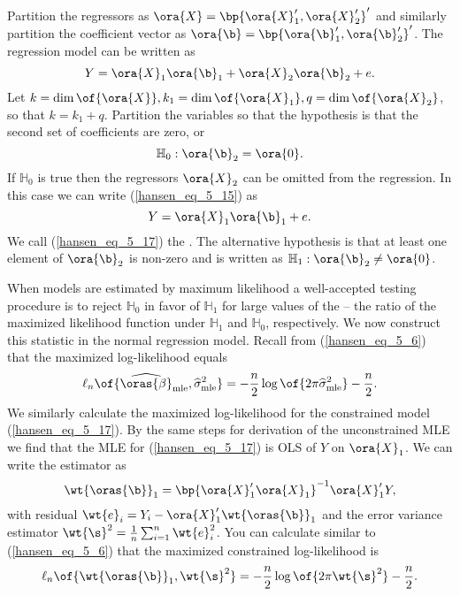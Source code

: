 Partition the regressors as $\ora{X} = \bp{\ora{X}_1^{\prime}, \ora{X}_2^{\prime}}^{\prime}$ and similarly partition the coefficient vector as $\ora{\b} = \bp{\ora{\b}_1^{\prime}, \ora{\b}_2^{\prime}}^{\prime}$. The regression model can be written as 
\begin{equation}
    \label{hansen_eq_5_15}
    Y = \ora{X}_1 \ora{\b}_1 + \ora{X}_2 \ora{\b}_2 + e.
\end{equation}
Let $k = \dim\of{\ora{X}}, k_1 = \dim\of{\ora{X}_1}, q = \dim\of{\ora{X}_2}$, so that $k = k_1 + q$. Partition the variables so that the hypothesis is that the second set of coefficients are zero, or 
\begin{equation}
    \label{hansen_eq_5_16}
    \mathbb{H}_0: \ora{\b}_2 = \ora{0}.
\end{equation}
If $\mathbb{H}_0$ is true then the regressors $\ora{X}_2$ can be omitted from the regression. In this case we can write (\ref{hansen_eq_5_15}) as 
\begin{equation}
    \label{hansen_eq_5_17}
    Y = \ora{X}_1 \ora{\b}_1 + e.
\end{equation}
We call (\ref{hansen_eq_5_17}) the . The alternative hypothesis is that at least one element of $\ora{\b}_2$ is non-zero and is written as $\mathbb{H}_1: \ora{\b}_2 \neq \ora{0}$.

When models are estimated by maximum likelihood a well-accepted testing procedure is to reject $\mathbb{H}_0$ in favor of $\mathbb{H}_1$ for large values of the  -- the ratio of the maximized likelihood function under $\mathbb{H}_1$ and $\mathbb{H}_0$, respectively. We now construct this statistic in the normal regression model. Recall from (\ref{hansen_eq_5_6}) that the maximized log-likelihood equals
\begin{equation}
    \notag
    \ell_n\of{\widehat{\oras{\beta}}_{\text{mle}}, \widehat{\sigma}_{\text{mle}}^2} = -\frac{n}{2} \log\of{2 \pi \widehat{\sigma}_{\text{mle}}^2} - \frac{n}{2}.
\end{equation}
We similarly calculate the maximized log-likelihood for the constrained model (\ref{hansen_eq_5_17}). By the same steps for derivation of the unconstrained MLE we find that the MLE for (\ref{hansen_eq_5_17}) is OLS of $Y$ on $\ora{X}_1$. We can write the estimator as 
\begin{equation}
    \notag 
    \wt{\oras{\b}}_1 = \bp{\ora{X}_1^\prime \ora{X}_1}^{-1} \ora{X}_1^\prime Y ,
\end{equation}
with residual $\wt{e}_i = Y_i - \ora{X}_1^{\prime} \wt{\oras{\b}}_1$ and the error variance estimator $\wt{\s}^2 = \frac{1}{n} \sum_{i=1}^{n} \wt{e}_i^2$. You can calculate similar to (\ref{hansen_eq_5_6}) that the maximized constrained log-likelihood is 
\begin{equation}
    \notag 
    \ell_n\of{\wt{\oras{\b}}_1, \wt{\s}^2} = -\frac{n}{2} \log\of{2 \pi \wt{\s}^2} - \frac{n}{2}.
\end{equation}

